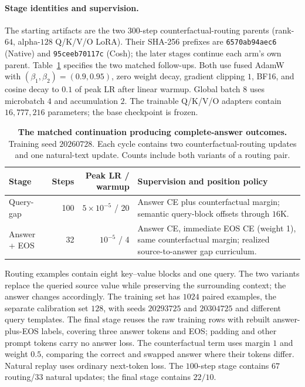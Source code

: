\paragraph{Stage identities and supervision.}
The starting artifacts are the two $300$-step counterfactual-routing parents (rank-$64$, alpha-$128$ Q/K/V/O LoRA). Their SHA-256 prefixes are \texttt{6570ab94aec6} (Native) and \texttt{95ceeb70117c} (Cosh); the later stages continue each arm's own parent. Table~\ref{tab:routing-stages} specifies the two matched follow-ups. Both use fused AdamW with $(\beta_1,\beta_2)=(0.9,0.95)$, zero weight decay, gradient clipping $1$, BF16, and cosine decay to $0.1$ of peak LR after linear warmup. Global batch $8$ uses microbatch $4$ and accumulation $2$. The trainable Q/K/V/O adapters contain $16{,}777{,}216$ parameters; the base checkpoint is frozen.

\begin{table}[ht]
\centering\small
\caption{\textbf{The matched continuation producing complete-answer outcomes.} Training seed $20260728$. Each cycle contains two counterfactual-routing updates and one natural-text update. Counts include both variants of a routing pair.}
\label{tab:routing-stages}
\begin{tabular}{@{}lrrp{.39\linewidth}@{}}
\toprule
Stage & Steps & Peak LR / warmup & Supervision and position policy \\
\midrule
Query-gap & 100 & $5\times10^{-5}$ / 20 & Answer CE plus counterfactual margin; semantic query-block offsets through $16$K. \\
Answer + EOS & 32 & $10^{-5}$ / 4 & Answer CE, immediate EOS CE (weight 1), same counterfactual margin; realized source-to-answer gap curriculum. \\
\bottomrule
\end{tabular}
\end{table}

Routing examples contain eight key--value blocks and one query. The two variants replace the queried source value while preserving the surrounding context; the answer changes accordingly. The training set has $1024$ paired examples, the separate calibration set $128$, with seeds $20293725$ and $20304725$ and different query templates. The final stage reuses the raw training rows with rebuilt answer-plus-EOS labels, covering three answer tokens and EOS; padding and other prompt tokens carry no answer loss. The counterfactual term uses margin $1$ and weight $0.5$, comparing the correct and swapped answer where their tokens differ. Natural replay uses ordinary next-token loss. The $100$-step stage contains $67$ routing/$33$ natural updates; the final stage contains $22/10$.

